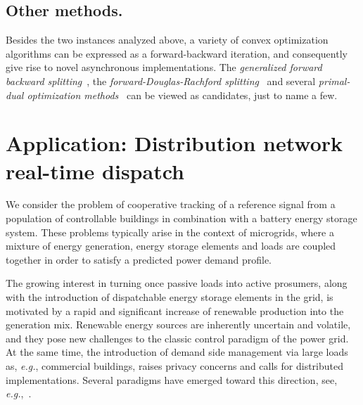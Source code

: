 \documentclass[envcountsect]{svjour3}
\newcommand{\eg}{{\it e.g.}}
\newcommand{\Hil}{{\mathcal{H} }}
\begin{document}

\subsection{Other methods. }{\label{subsec::others}}
Besides the two instances analyzed above, a variety of convex optimization algorithms can be expressed as a forward-backward iteration, and consequently give rise to novel asynchronous implementations. The \emph{generalized forward backward splitting}~\cite{GFBS,PrecGFBS}, the \emph{forward-Douglas-Rachford splitting}~\cite{FDRS,FDRS_rate} and several \emph{primal-dual optimization methods}~\cite{combettes2014forward} can be viewed as candidates, just to name a few.



\section{Application: Distribution network real-time dispatch }\label{sec::example}
We consider the problem of cooperative tracking of a reference signal from a population of controllable buildings in combination with a battery energy storage system. These problems typically arise in the context of microgrids, where a mixture of energy generation, energy storage elements and loads are coupled together in order to satisfy a predicted power demand profile.

The growing interest in turning once passive loads into active prosumers, along with the introduction of dispatchable energy storage elements in the grid, is motivated by a rapid and significant increase of renewable production into the generation mix. Renewable energy sources are inherently uncertain and volatile, and they pose new challenges to the classic control paradigm of the power grid. At the same time, the introduction of demand side management via large loads as, \eg, commercial buildings, raises privacy concerns and calls for distributed implementations. Several paradigms have emerged toward this direction, see, \eg,~\cite{EPFL-ARTICLE-222513}.
\end{document}
